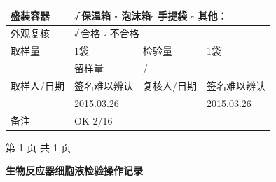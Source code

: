 \documentclass[UTF8,10pt,a4paper,fontset=fandol]{ctexart}
\newcommand{\fieldvalue}[1]{#1}
\newcommand{\handwritten}[1]{#1}
\begin{document}
\begin{tabularx}{\textwidth}{|>{\centering\arraybackslash}p{2.2cm}|X|>{\centering\arraybackslash}p{2.2cm}|X|}
盛装容器 &
\multicolumn{3}{l|}{
\fieldvalue{\handwritten{√\,保温箱}}\qquad
$\square$ 泡沫箱\qquad $\square$ 手提袋\qquad
$\square$ 其他：\underline{\hspace{1.8cm}}}
\\ \hline

外观复核 &
\multicolumn{3}{l|}{
\fieldvalue{\handwritten{√\,合格}}\qquad
$\square$ 不合格}
\\ \hline

取样量 &
\fieldvalue{1袋} &
检验量 &
\fieldvalue{1袋} \\
\cline{3-4}
\multicolumn{2}{c|}{} &
留样量 &
\fieldvalue{/}
\\ \hline

取样人/日期 &
\fieldvalue{\handwritten{签名难以辨认}} &
复核人/日期 &
\fieldvalue{\handwritten{签名难以辨认}}
\\ \cline{2-2}\cline{4-4}
&
\fieldvalue{\handwritten{2015.03.26}} &
&
\fieldvalue{\handwritten{2015.03.26}}
\\ \hline

备注 &
\multicolumn{3}{l|}{
\fieldvalue{\handwritten{OK 2/16}}}
\\ \hline
\end{tabularx}

\vfill
\begin{center}
\scriptsize 第 1 页 共 1 页
\end{center}

\newpage

\begin{center}
\textbf{生物反应器细胞液检验操作记录}
\end{center}
\end{document}
